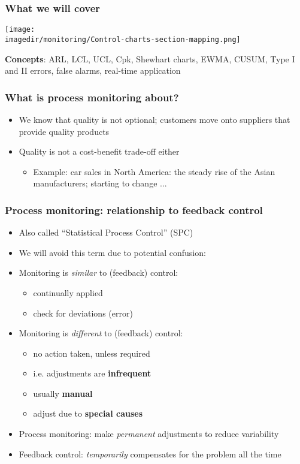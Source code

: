 \begin{frame}\frametitle{What we will cover}
	
	\texttt{[image: \\imagedir/monitoring/Control-charts-section-mapping.png]}
	
	\textbf{Concepts}: ARL, LCL, UCL, Cpk, Shewhart charts, EWMA, CUSUM, Type I and II errors, false alarms, real-time application
\end{frame}

\begin{frame}\frametitle{What is process monitoring about?}
	\begin{itemize}
		\item	We know that quality is not optional; customers move onto suppliers that provide quality products 
		\item	Quality is not a cost-benefit trade-off either 
		\begin{itemize}
			\item	Example: car sales in North America: the steady rise of the Asian manufacturers; starting to change ... 
		\end{itemize}
	\end{itemize}
\end{frame}

\begin{frame}\frametitle{Process monitoring: relationship to feedback control}
	\begin{itemize}
		\item	Also called ``Statistical Process Control'' (SPC) 
		\item	We will avoid this term due to potential confusion: 
		\item	Monitoring is \emph{similar} to (feedback) control: 
		\begin{itemize}
			\item	continually applied 
			\item	check for deviations (error) 
		\end{itemize}
		\item	Monitoring is \emph{different} to (feedback) control: 
		\begin{itemize}
			\item	no action taken, unless required 
			\item	i.e. adjustments are \textbf{infrequent} 
			\item	usually \textbf{manual} 
			\item	adjust due to \textbf{special causes} 
		\end{itemize}
	\end{itemize}
	\begin{itemize}
		\item	Process monitoring: make \emph{permanent} adjustments to reduce variability 
		\item	Feedback control: \emph{temporarily} compensates for the problem all the time 
	\end{itemize}
\end{frame}

